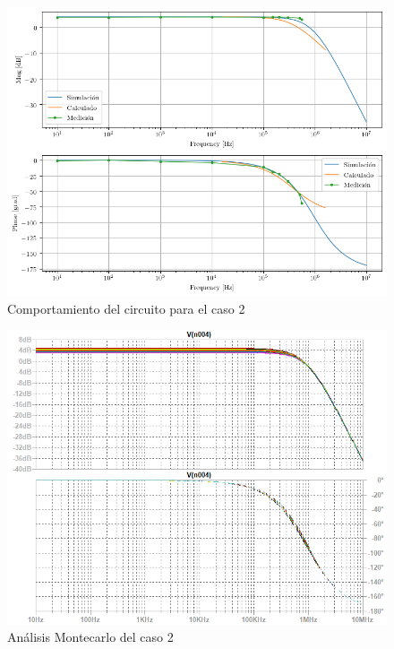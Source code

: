 \begin{figure}[H]
\begin{centering}
\includegraphics[scale=0.5]{../Ex1/iB/Resources1b/H2b}
\par\end{centering}
\caption{Comportamiento del circuito para el caso 2}
\end{figure}

\begin{figure}[H]
\begin{centering}
\includegraphics[scale=0.5]{../Ex1/iB/Resources1b/Montecarlo2}
\par\end{centering}
\caption{Análisis Montecarlo del caso 2}
\end{figure}

